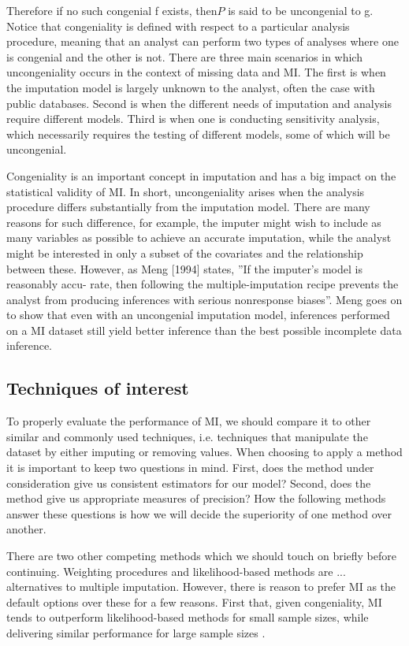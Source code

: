 \documentclass{article}
\begin{document}
	Therefore if no such congenial f exists, then$P$ is said to be uncongenial to g. Notice that congeniality is defined with respect to a particular analysis procedure, meaning that an analyst can perform two types of analyses where one is congenial and the other is not. There are three main scenarios in which uncongeniality occurs in the context of missing data and MI. The first is when the imputation model is largely unknown to the analyst, often the case with public databases. Second is when the different needs of imputation and analysis require different models. Third is when one is conducting sensitivity analysis, which necessarily requires the testing of different models, some of which will be uncongenial.
	
	Congeniality is an important concept in imputation and has a big impact on the statistical validity of MI. In short, uncongeniality arises when the analysis procedure differs substantially from the imputation model. There are many reasons for such difference, for example, the imputer might wish to include as many variables as possible to achieve an accurate imputation, while the analyst might be interested in only a subset of the covariates and the relationship between these. However, as Meng [1994] states, ''If the imputer's model is reasonably accu-
	rate, then following the multiple-imputation recipe
	prevents the analyst from producing inferences with
	serious nonresponse biases''. Meng goes on to show that even with an uncongenial imputation model, inferences performed on a MI dataset still yield better inference than the best possible incomplete data inference.
	
	\subsection{Techniques of interest}
	To properly evaluate the performance of MI, we should compare it to other similar and commonly used techniques, i.e. techniques that manipulate the dataset by either imputing or removing values. When choosing to apply a method it is important to keep two questions in mind. First, does the method under consideration give us consistent estimators for our model? Second, does the method give us appropriate measures of precision? How the following methods answer these questions is how we will decide the superiority of one method over another.
	
	There are two other competing methods which we should touch on briefly before continuing. Weighting procedures and likelihood-based methods are ... alternatives to multiple imputation. However, there is reason to prefer MI as the default options over these for a few reasons. First that, given congeniality, MI tends to outperform likelihood-based methods for small sample sizes, while delivering similar performance for large sample sizes \cite{schafer_multiple_2016}.
	
\end{document}
